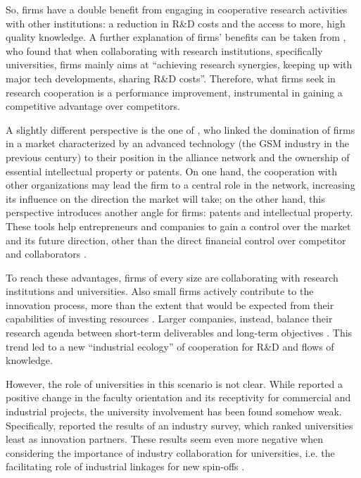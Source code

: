 So, firms have a double benefit from engaging in cooperative research activities with other institutions: a reduction in R\&D costs and the access to more, high quality knowledge. A further explanation of firms' benefits can be taken from \citet{Caloghirou2001}, who found that when collaborating with research institutions, specifically universities, firms mainly aims at \enquote{achieving research synergies, keeping up with major tech developments, sharing R\&D costs}. Therefore, what firms seek in research cooperation is a performance improvement, instrumental in gaining a competitive advantage over competitors. 

A slightly different perspective is the one of \citet{Bekkers2002}, who linked the domination of firms in a market characterized by an advanced technology (the GSM industry in the previous century) to their position in the alliance network and the ownership of essential intellectual property or patents. On one hand, the cooperation with other organizations may lead the firm to a central role in the network, increasing its influence on the direction the market will take; on the other hand, this perspective introduces another angle for firms: patents and intellectual property. These tools help entrepreneurs and companies to gain a control over the market and its future direction, other than the direct financial control over competitor and collaborators \citep{Siegel2003a}. 

To reach these advantages, firms of every size are collaborating with research institutions and universities. Also small firms actively contribute to the innovation process, more than the extent that would be expected from their capabilities of investing resources \citep{Audretsch2005}. Larger companies, instead, balance their research agenda between short-term deliverables and long-term objectives \citep{Tijssen2006}. This trend led to a new \enquote{industrial ecology} of cooperation for R\&D and flows of knowledge.

However, the role of universities in this scenario is not clear. While \citet{Thursby2002} reported a positive change in the faculty orientation and its receptivity for commercial and industrial projects, the university involvement has been found somehow weak. Specifically, \citet{Yusuf2008} reported the results of an industry survey, which ranked universities least as innovation partners. These results seem even more negative when considering the importance of industry collaboration for universities, i.e. the facilitating role of industrial linkages for new spin-offs \citep{OShea2005}.

